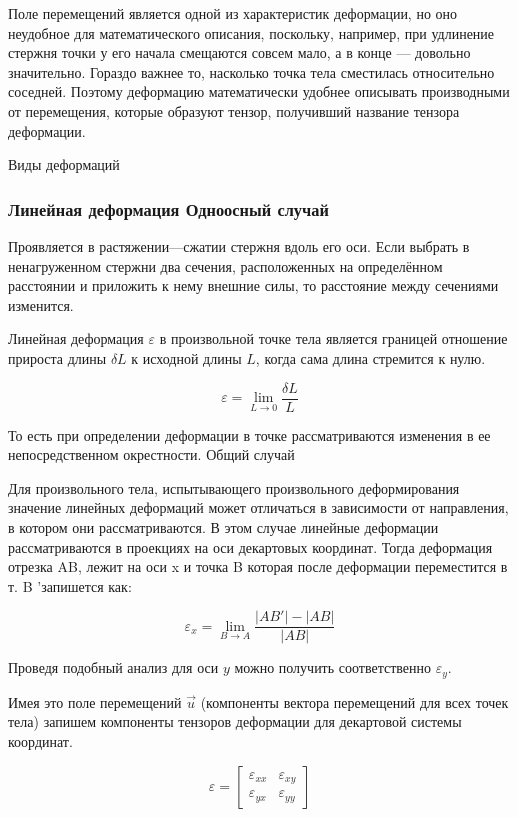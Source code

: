 Поле перемещений является одной из характеристик деформации, но оно неудобное для математического описания, поскольку, например, при удлинение стержня точки у его начала смещаются совсем мало, а в конце — довольно значительно. Гораздо важнее то, насколько точка тела сместилась относительно соседней. Поэтому деформацию математически удобнее описывать производными от перемещения, которые образуют тензор, получивший название тензора деформации.

Виды деформаций
\subsubsection{Линейная деформация Одноосный случай}

Проявляется в растяжении—сжатии стержня вдоль его оси. Если выбрать в ненагруженном стержни два сечения, расположенных на определённом расстоянии и приложить к нему внешние силы, то расстояние между сечениями изменится.

Линейная деформация $\varepsilon$ в произвольной точке тела является границей отношение прироста длины $\delta L$ к исходной длины $L$, когда сама длина стремится к нулю.

\[ \varepsilon = \lim_{L \to 0} \frac{{\delta} {L}} {L} \]

То есть при определении деформации в точке рассматриваются изменения в ее непосредственном окрестности.
Общий случай

Для произвольного тела, испытывающего произвольного деформирования значение линейных деформаций может отличаться в зависимости от направления, в котором они рассматриваются. В этом случае линейные деформации рассматриваются в проекциях на оси декартовых координат. Тогда деформация отрезка AB, лежит на оси x и точка B которая после деформации переместится в т. B 'запишется как:

\[ \varepsilon_x = \lim_{B \to A} {\frac{| AB '| - | AB |}{| AB |}} \]

Проведя подобный анализ для оси $y$ можно получить соответственно $\varepsilon_y$.

Имея это поле перемещений $\overrightarrow u$ (компоненты вектора перемещений для всех точек тела) запишем компоненты тензоров деформации для декартовой системы координат.

\[ \varepsilon = \left [{\begin {matrix} 
{\varepsilon_{xx}} & {\varepsilon_{xy}} \\ 
{\varepsilon_{yx}} & {\varepsilon_{yy}} 
\end{matrix}} \right] \]

